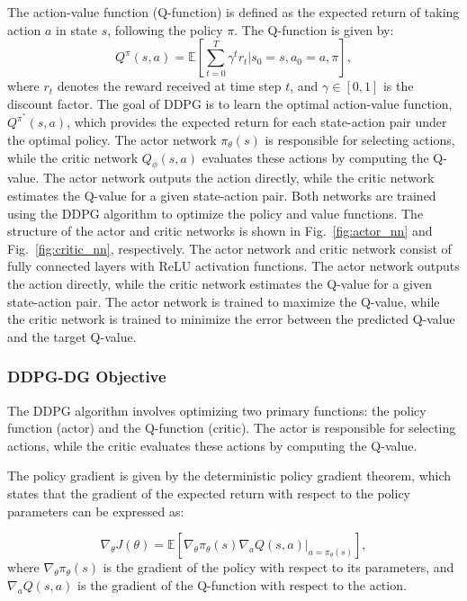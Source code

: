 \documentclass[conference]{IEEEtran}
\begin{document}
The action-value function (Q-function) is defined as the expected return of taking action \( a \) in state \( s \), following the policy \( \pi \). The Q-function is given by:
\begin{equation}
    Q^{\pi}(s, a) = \mathbb{E} \left[ \sum_{t=0}^{T} \gamma^t r_t | s_0 = s, a_0 = a, \pi \right],
\end{equation}
where \( r_t \) denotes the reward received at time step \( t \), and \( \gamma \in [0, 1] \) is the discount factor. The goal of DDPG is to learn the optimal action-value function, \( Q^{\pi^*}(s, a) \), which provides the expected return for each state-action pair under the optimal policy.
The actor network \( \pi_{\theta}(s) \) is responsible for selecting actions, while the critic network \( Q_{\phi}(s, a) \) evaluates these actions by computing the Q-value. The actor network outputs the action directly, while the critic network estimates the Q-value for a given state-action pair. Both networks are trained using the DDPG algorithm to optimize the policy and value functions.
The structure of the actor and critic networks is shown in Fig.~\ref{fig:actor_nn} and Fig.~\ref{fig:critic_nn}, respectively. The actor network and critic network consist of fully connected layers with ReLU activation functions. The actor network outputs the action directly, while the critic network estimates the Q-value for a given state-action pair. The actor network is trained to maximize the Q-value, while the critic network is trained to minimize the error between the predicted Q-value and the target Q-value.


\subsubsection{DDPG-DG Objective}

The DDPG algorithm involves optimizing two primary functions: the policy function (actor) and the Q-function (critic). The actor is responsible for selecting actions, while the critic evaluates these actions by computing the Q-value.

The policy gradient is given by the deterministic policy gradient theorem, which states that the gradient of the expected return with respect to the policy parameters can be expressed as:

\begin{equation}
    \nabla_{\theta} J(\theta) = \mathbb{E} \left[ \nabla_{\theta} \pi_{\theta}(s) \nabla_a Q(s, a) |_{a = \pi_{\theta}(s)} \right],
\end{equation}
where \( \nabla_{\theta} \pi_{\theta}(s) \) is the gradient of the policy with respect to its parameters, and \( \nabla_a Q(s, a) \) is the gradient of the Q-function with respect to the action.
\end{document}
